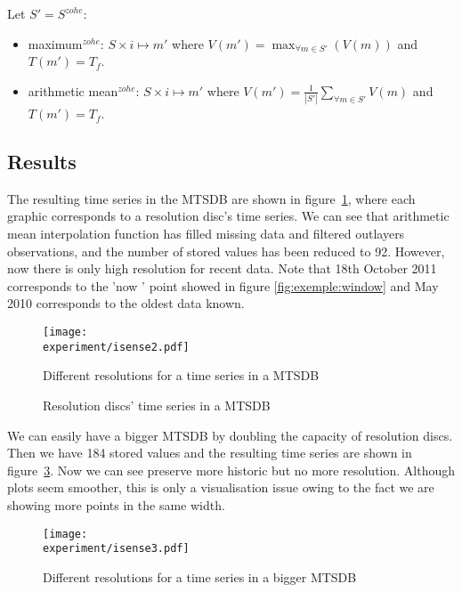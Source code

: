 Let $S'=S^{zohe}$:
\begin{itemize}
\item maximum$^{zohe}$: $S \times i \mapsto m'$ where $V(m') =
  \max_{\forall m \in S'}(V(m))$ and $T(m')=T_f$.
\item arithmetic mean$^{zohe}$: $S \times i \mapsto m'$ where $V(m')
  = \frac{1}{|S'|} \sum\limits_{\forall m\in S'} V(m)$ and
  $T(m')=T_f$. 
\end{itemize}







\subsection{Results}

The resulting time series in the MTSDB are shown in
figure~\ref{fig:exemple:4mrd}, where each graphic corresponds to a
resolution disc's time series. We can see that arithmetic mean
interpolation function has filled missing data and filtered outlayers
observations, and the number of stored values has
been reduced to 92. However, now there is only high resolution for
recent data. Note that 18th October 2011 corresponds to the 'now '
point showed in figure \ref{fig:exemple:window} and May 2010
corresponds to the oldest data known.

\begin{figure}[tp]
\centering
\texttt{[image: \\experiment/isense2.pdf]}
\caption{Different resolutions for a time series in a MTSDB}
\label{fig:exemple:4mrd}
\end{figure}

\begin{figure}[tp]
  \centering
  \scriptsize
  
  \caption{Resolution discs' time series in a MTSDB}
  \label{fig:exemple:original}
\end{figure}



We can easily have a bigger MTSDB by doubling the capacity of
resolution discs. Then we have 184 stored values and the resulting
time series are shown in figure~\ref{fig:exemple:4mrdbigger}.  Now we
can see preserve more historic but no more resolution. Although plots seem
smoother, this is only a visualisation issue owing to the fact we are
showing more points in the same width.

\begin{figure}[tp]
\centering
\texttt{[image: \\experiment/isense3.pdf]}
\caption{Different resolutions for a time series in a bigger MTSDB}
\label{fig:exemple:4mrdbigger}
\end{figure}





